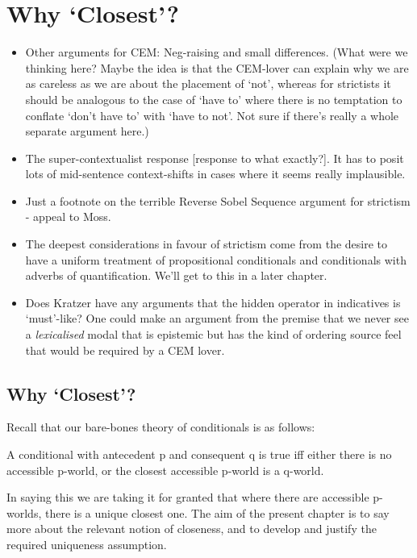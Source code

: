 \documentclass[If.tex]{subfiles}
\begin{document}
\chapter{Why ‘Closest’?}
\begin{itemize}
	\item
	Other arguments for CEM: Neg-raising and small differences.
	(What were we thinking here?  Maybe the idea is that the CEM-lover can explain why we are as careless as we are about the placement of ‘not’, whereas for strictists it should be analogous to the case of ‘have to’ where there is no temptation to conflate ‘don't have to’ with ‘have to not’.  Not sure if there's really a whole separate argument here.)
	\item
	The super-contextualist response [response to what exactly?]. It has to posit lots of mid-sentence context-shifts in cases where it seems really implausible.
	\item
	Just a footnote on the terrible Reverse Sobel Sequence argument for strictism - appeal to Moss.
	\item
	The deepest considerations in favour of strictism come from the desire to have a uniform treatment of propositional conditionals and conditionals with adverbs of quantification. We'll get to this in a later chapter.
	\item
	Does Kratzer have any arguments that the hidden operator in indicatives is ‘must’-like? One could make an argument from the premise that we never see a \emph{lexicalised} modal that is epistemic but has the kind of ordering source feel that would be required by a CEM lover.
\end{itemize}

\section{\texorpdfstring{Why ‘Closest’?}{Why Closest?}}\label{why-closest}

Recall that our bare-bones theory of conditionals is as follows:
\begin{prop}
\litem[CLOSEST] \label{closest}
	A conditional with antecedent p and consequent q is true iff either there is no accessible p-world, or the closest accessible p-world is a q-world.
\end{prop}
In saying this we are taking it for granted that where there are accessible p-worlds, there is a unique closest one. The aim of the present chapter is to say more about the relevant notion of closeness, and to develop and justify the required uniqueness assumption.
\end{document}
